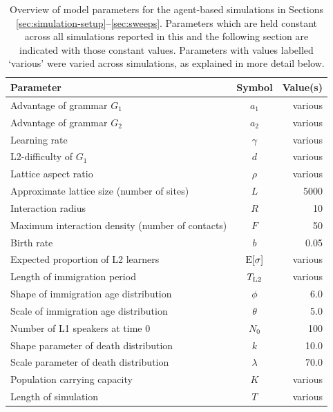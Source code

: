 \begin{table}\caption{Overview of model parameters for the agent-based simulations in Sections \ref{sec:simulation-setup}--\ref{sec:sweeps}. Parameters which are held constant across all simulations reported in this and the following section are indicated with those constant values. Parameters with values labelled `various' were varied across simulations, as explained in more detail below.}\label{tbl:parameters}\begin{tabular}{lcr}
\toprule
Parameter & Symbol & Value(s) \\
\midrule
Advantage of grammar $G_1$ & $a_1$ & various \\
Advantage of grammar $G_2$ & $a_2$ & various \\
Learning rate & $\gamma$ & various \\
L2-difficulty of $G_1$ & $d$ & various \\
Lattice aspect ratio & $\rho$ & various \\
Approximate lattice size (number of sites) & $L$ & 5000 \\
Interaction radius & $R$ & 10 \\
Maximum interaction density (number of contacts) & $F$ & 50 \\
Birth rate & $b$ & 0.05 \\
Expected proportion of L2 learners & $\textnormal{E}[\sigma]$ & various \\
Length of immigration period & $T_\textnormal{L2}$ & various \\
Shape of immigration age distribution & $\phi$ & 6.0 \\
Scale of immigration age distribution & $\theta$ & 5.0 \\
Number of L1 speakers at time 0 & $N_0$ & 100 \\
Shape parameter of death distribution & $k$ & 10.0 \\
Scale parameter of death distribution & $\lambda$ & 70.0 \\
Population carrying capacity & $K$ & various \\
Length of simulation & $T$ & various \\
\bottomrule
\end{tabular}
\end{table}
